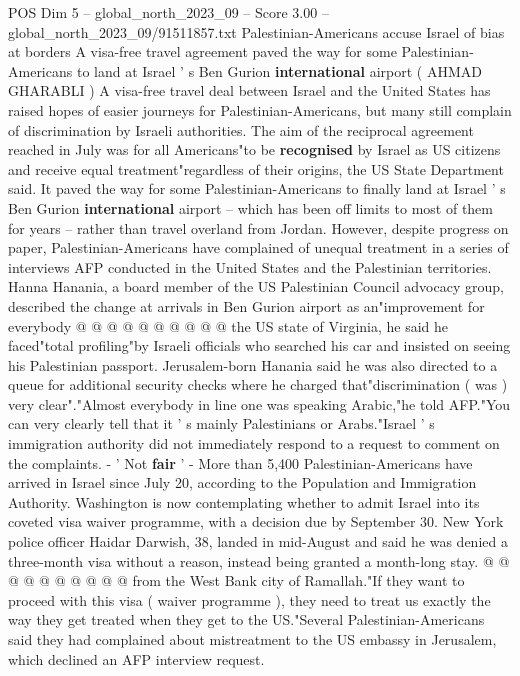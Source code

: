 \begin{textsample}{POS Dim 5 – global\_north\_2023\_09 – Score 3.00 – global\_north\_2023\_09/91511857.txt}  \label{ex:f5_pos_443}
Palestinian-Americans accuse Israel of bias at borders A visa-free travel agreement paved the way for some Palestinian-Americans to land at Israel ' s Ben Gurion \textbf{international} airport ( AHMAD GHARABLI ) A visa-free travel deal between Israel and the United States has raised hopes of easier journeys for Palestinian-Americans, but many still complain of discrimination by Israeli authorities.
The aim of the reciprocal agreement reached in July was for all Americans"to be \textbf{recognised} by Israel as US citizens and receive equal treatment"regardless of their origins, the US State Department said.
It paved the way for some Palestinian-Americans to finally land at Israel ' s Ben Gurion \textbf{international} airport -- which has been off limits to most of them for years -- rather than travel overland from Jordan.
However, despite progress on paper, Palestinian-Americans have complained of unequal treatment in a series of interviews AFP conducted in the United States and the Palestinian territories.
Hanna Hanania, a board member of the US Palestinian Council advocacy group, described the change at arrivals in Ben Gurion airport as an"improvement for everybody @ @ @ @ @ @ @ @ @ @ the US state of Virginia, he said he faced"total profiling"by Israeli officials who searched his car and insisted on seeing his Palestinian passport.
Jerusalem-born Hanania said he was also directed to a queue for additional security checks where he charged that"discrimination ( was ) very clear"."Almost everybody in line one was speaking Arabic,"he told AFP."You can very clearly tell that it ' s mainly Palestinians or Arabs."Israel ' s immigration authority did not immediately respond to a request to comment on the complaints. - ' Not \textbf{fair} ' - More than 5,400 Palestinian-Americans have arrived in Israel since July 20, according to the Population and Immigration Authority.
Washington is now contemplating whether to admit Israel into its coveted visa waiver programme, with a decision due by September 30.
New York police officer Haidar Darwish, 38, landed in mid-August and said he was denied a three-month visa without a reason, instead being granted a month-long stay. @ @ @ @ @ @ @ @ @ @ from the West Bank city of Ramallah."If they want to proceed with this visa ( waiver programme ), they need to treat us exactly the way they get treated when they get to the US."Several Palestinian-Americans said they had complained about mistreatment to the US embassy in Jerusalem, which declined an AFP interview request.

\end{textsample}
